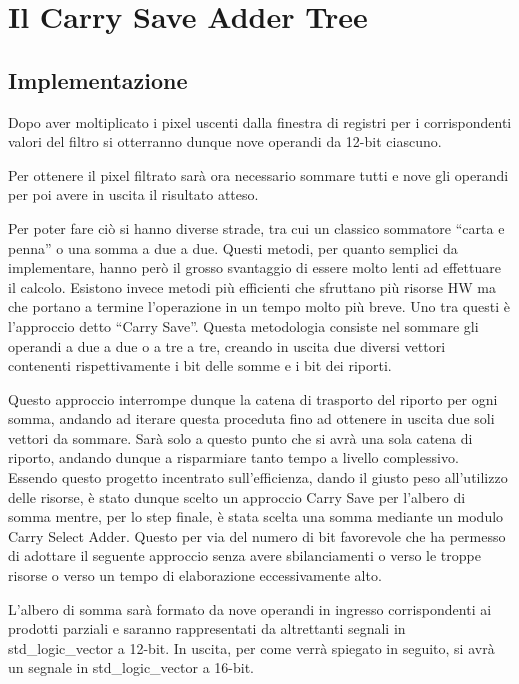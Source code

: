 \maketitle
\chapter{Il Carry Save Adder Tree}
\section{Implementazione}
Dopo aver moltiplicato i pixel uscenti dalla finestra di registri per i corrispondenti valori del filtro si otterranno dunque nove operandi da 12-bit ciascuno. 

Per ottenere il pixel filtrato sarà ora necessario sommare tutti e nove gli operandi per poi avere in uscita il risultato atteso. 

Per poter fare ciò si hanno diverse strade, tra cui un classico sommatore “carta e penna” o una somma a due a due. Questi metodi, per quanto semplici da implementare, hanno però il grosso svantaggio di essere molto lenti ad effettuare il calcolo. Esistono invece metodi più efficienti che sfruttano più risorse HW ma che portano a termine l’operazione in un tempo molto più breve. Uno tra questi è l’approccio detto “Carry Save”. Questa metodologia consiste nel sommare gli operandi a due a due o a tre a tre, creando in uscita due diversi vettori contenenti rispettivamente i bit delle somme e i bit dei riporti. 

Questo approccio interrompe dunque la catena di trasporto del riporto per ogni somma, andando ad iterare questa proceduta fino ad ottenere in uscita due soli vettori da sommare. Sarà solo a questo punto che si avrà una sola catena di riporto, andando dunque a risparmiare tanto tempo a livello complessivo. Essendo questo progetto incentrato sull’efficienza, dando il giusto peso all’utilizzo delle risorse, è stato dunque scelto un approccio Carry Save per l’albero di somma mentre, per lo step finale, è stata scelta una somma mediante un modulo Carry Select Adder. Questo per via del numero di bit favorevole che ha permesso di adottare il seguente approccio senza avere sbilanciamenti o verso le troppe risorse o verso un tempo di elaborazione eccessivamente alto.

L’albero di somma sarà formato da nove operandi in ingresso corrispondenti ai prodotti parziali e saranno rappresentati da altrettanti segnali in std\_logic\_vector a 12-bit.
In uscita, per come verrà spiegato in seguito, si avrà un segnale in std\_logic\_vector a 16-bit.

